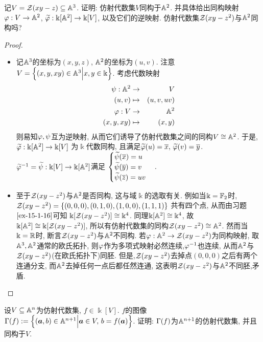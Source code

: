 \documentclass[oneside,a4papar,11pt,UTF8]{book}
\begin{document}
\begin{enumerate}
  \begin{prob}\label{ex-15-1-24}
    记$V=\mathcal{Z}(xy-z)\subseteq\mathbb{A}^3$.
    证明: 仿射代数集$V$同构于$\mathbb{A}^2$.
    并具体给出同构映射$\varphi:V\to\mathbb{A}^2$,
    $\widetilde{\varphi}:\Bbbk[\mathbb{A}^2]\to\Bbbk[V]$,
    以及它们的逆映射.
    仿射代数集$\mathcal{Z}(xy-z^2)$与$\mathbb{A}^2$同构吗?
  \end{prob}

  \begin{proof}\,
    \begin{itemize}
    \item
    记$\mathbb{A}^3$的坐标为$(x,y,z)$,
    $\mathbb{A}^2$的坐标为$(u,v)$.
    注意$V=\Big\{ (x,y,xy)\in\mathbb{A}^3 \Big| x,y\in\Bbbk \Big\}$.
    考虑代数映射
    \begin{eqnarray*}
      \psi: \mathbb{A}^2&\to& V\\
      (u,v)&\mapsto&(u,v,uv)\\
      \varphi:V&\to&\mathbb{A}^2\\
      (x,y,xy)&\mapsto& (x,y)
    \end{eqnarray*}
  则易知$\varphi,\psi$互为逆映射,
  从而它们诱导了仿射代数集之间的同构$V\cong\mathbb{A}^2$.
  于是,$\widetilde{\varphi}:\Bbbk[\mathbb{A}^2]\to\Bbbk[V]$
  为$\Bbbk$代数同构,
  且满足$\widetilde{\varphi}(u)=\overline{x},\,\widetilde{\varphi}(v)=\overline{y}$.
  $\widetilde{\varphi}^{-1}=\widetilde{\psi}:\Bbbk[V]\to\Bbbk[\mathbb{A}^2]$满足
  $\begin{cases}
    \widetilde{\psi}(\overline{x})=u\\
    \widetilde{\psi}(\overline{y})=v\\
    \widetilde{\psi}(\overline{z})=uv
  \end{cases}.$

  \item 至于$\mathcal{Z}(xy-z^2)$与$\mathbb{A}^2$是否同构,
  这与域$\Bbbk$的选取有关.
  例如当$\Bbbk=\mathbb{F}_2$时,
  $\mathcal{Z}(xy-z^2)=\{(0,0,0),(0,1,0),(1,0,0),(1,1,1)\}$
  共有四个点,
  从而由习题$\ref{ex-15-1-16}$可知
  $\Bbbk[\mathcal{Z}(xy-z^2)]\cong\Bbbk^4$.
  同理$\Bbbk[\mathbb{A}^2]\cong\Bbbk^4$,
  故$\Bbbk[\mathbb{A}^2]\cong\Bbbk[\mathcal{Z}(xy-z^2)]$,
  所以有仿射代数集的同构$\mathcal{Z}(xy-z^2)\cong\mathbb{A}^2$.
  然而当$\Bbbk=\mathbb{R}$时,
  断言$\mathcal{Z}(xy-z^2)$与$\mathbb{A}^2$不同构.
  若$\varphi:\mathbb{A}^2\to\mathcal{Z}(xy-z^2)$为同构映射,
  取$\mathbb{A}^3,\mathbb{A}^2$通常的欧氏拓扑,
  则$\varphi$作为多项式映射必然连续,$\varphi^{-1}$也连续,
  从而$\mathbb{A}^2$与$\mathcal{Z}(xy-z^2)$(在欧氏拓扑下)同胚.
  但是,$\mathcal{Z}(xy-z^2)$去掉点$(0,0,0)$之后有两个连通分支,
  而$\mathbb{A}^2$去掉任何一点后都任然连通,
  这表明$\mathcal{Z}(xy-z^2)$与$\mathbb{A}^2$不同胚,矛盾.
  \end{itemize}
  \end{proof}

  \begin{prob}\label{ex-15-1-25}
    设$V\subseteq\mathbb{A}^n$为仿射代数集,
    $f\in\Bbbk[V]$.
    $f$的图像$\Gamma(f):=
    \Big\{ (\boldsymbol{a},b)\in\mathbb{A}^{n+1} \Big| \boldsymbol{a}\in V,\,b=f(\boldsymbol{a}) \Big\}$.
    证明: $\Gamma(f)$为$\mathbb{A}^{n+1}$的仿射代数集,
    并且同构于$V$.
  \end{prob}


\end{enumerate}
\end{document}
